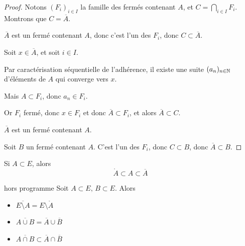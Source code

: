 \begin{proof}
    Notons $(F_i)_{i \in I}$ la famille des fermés contenant $A$, et
    $ \displaystyle C = \bigcap_{i \in I} F_i$. Montrons que $C = \overline{A}$.

    $\overline{A}$ est un fermé contenant $A$, donc c'est l'un des $F_i$, donc $ C \subset \overline{A}$.

    Soit $x \in \overline{A}$, et soit $i \in I$. 

    Par caractérisation séquentielle de l'adhérence, il existe une suite $(a_n)_{n \in \mathbb{N}}$ d'éléments de $A$ qui converge vers $x$.

    Mais $A \subset F_i$, donc $a_n \in F_i$.

    Or $F_i$ fermé, donc $x \in F_i$ et donc $\overline A \subset F_i$, 
    et alors $\overline A \subset C$.

    $\overline A$ est un fermé contenant $A$. 

    Soit $B$ un fermé contenant $A$. C'est l'un des $F_i$, donc $C \subset B$, 
    donc $\overline A \subset B$.
\end{proof}



\avspace Si $A \subset E$, alors
$$\mathring A \subset A \subset \overline A$$


\begin{proposition}{hors programme}{}
    Soit $A \subset E, \, B \subset E$. Alors 
    \begin{itemize}
        \item $\overline{E \setminus A} = E \setminus \mathring{A}$
        \item $\overline{A \cup B} = \overline{A} \cup \overline{B}$
        \item $\overline{A \cap B} \subset \overline{A} \cap \overline{B}$
    \end{itemize} 
\end{proposition}


